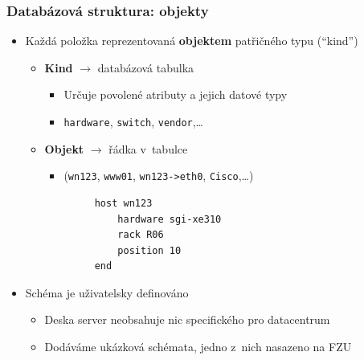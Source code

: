 \documentclass{beamer}
\begin{document}
\begin{frame}[fragile]
\frametitle{Databázová struktura: objekty}
\begin{itemize}
    \item Každá položka reprezentovaná {\bf objektem} patřičného typu (``kind'')
        \begin{itemize}
            \item {\bf Kind} $\rightarrow$ databázová tabulka
                \begin{itemize}
                    \item Určuje povolené atributy a jejich datové typy
                    \item {\tt hardware}, {\tt switch}, {\tt vendor},\ldots
                \end{itemize}
            \item {\bf Objekt} $\rightarrow$ řádka v~tabulce
                \begin{itemize}
                    \item ({\tt wn123}, {\tt www01}, {\tt wn123->eth0}, {\tt Cisco},\ldots)
                \end{itemize}
        \end{itemize}
        \begin{verbatim}
            host wn123
                hardware sgi-xe310
                rack R06
                position 10
            end
        \end{verbatim}
    \item Schéma je uživatelsky definováno
        \begin{itemize}
            \item Deska server neobsahuje nic specifického pro datacentrum
            \item Dodáváme ukázková schémata, jedno z~nich nasazeno na FZU
        \end{itemize}
\end{itemize}
\end{frame}
\end{document}
